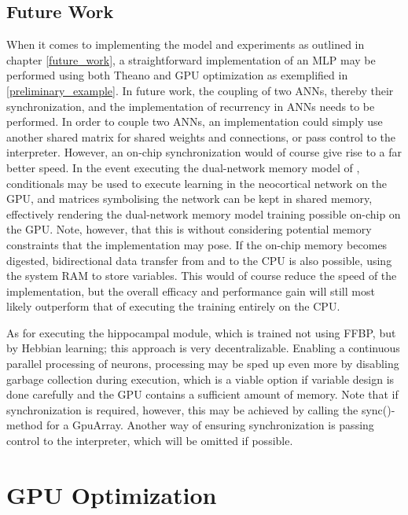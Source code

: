 \subsection{Future Work}

When it comes to implementing the model and experiments as outlined in chapter \ref{future_work}, a straightforward implementation of an MLP may be performed using both Theano and GPU optimization as exemplified in \ref{preliminary_example}. In future work, the coupling of two ANNs, thereby their synchronization, and the implementation of recurrency in ANNs needs to be performed. In order to couple two ANNs, an implementation could simply use another shared matrix for shared weights and connections, or pass control to the interpreter. However, an on-chip synchronization would of course give rise to a far better speed. In the event executing the dual-network memory model of \cite{Hattori2014}, conditionals may be used to execute learning in the neocortical network on the GPU, and matrices symbolising the network can be kept in shared memory, effectively rendering the dual-network memory model training possible on-chip on the GPU. Note, however, that this is without considering potential memory constraints that the implementation may pose. If the on-chip memory becomes digested, bidirectional data transfer from and to the CPU is also possible, using the system RAM to store variables. This would of course reduce the speed of the implementation, but the overall efficacy and performance gain will still most likely outperform that of executing the training entirely on the CPU.

As for executing the hippocampal module, which is trained not using FFBP, but by Hebbian learning; this approach is very decentralizable. Enabling a continuous parallel processing of neurons, processing may be sped up even more by disabling garbage collection during execution, which is a viable option if variable design is done carefully and the GPU contains a sufficient amount of memory. Note that if synchronization is required, however, this may be achieved by calling the sync()-method for a GpuArray. Another way of ensuring synchronization is passing control to the interpreter, which will be omitted if possible.


\section{GPU Optimization}

